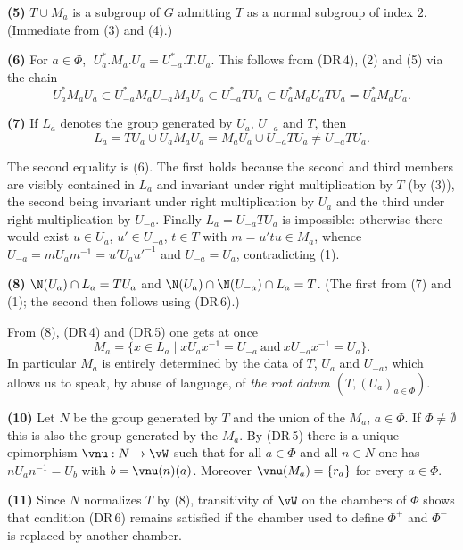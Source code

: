 \documentclass[12pt,a4paper,oneside,english]{smfart}
\theoremstyle{definition}
\theoremstyle{bt}
\begin{document}
\noindent\textbf{(5)} $T\cup M_a$ is a subgroup of $G$ admitting $T$ as a normal
subgroup of index $2$. (Immediate from (3) and (4).)

\medskip
\noindent\textbf{(6)} For $a\in\Phi$, $\;U_a^{*}.M_a.U_a=U_{-a}^{*}.T.U_a$.
This follows from (DR\,4), (2) and (5) via the chain
\[ U_a^{*}M_aU_a\subset U_{-a}^{*}M_aU_{-a}M_aU_a\subset U_{-a}^{*}TU_a
   \subset U_a^{*}M_aU_aTU_a=U_a^{*}M_aU_a. \]

\medskip
\noindent\textbf{(7)} If $L_a$ denotes the group generated by $U_a$, $U_{-a}$
and $T$, then
\[ L_a=TU_a\cup U_aM_aU_a=M_aU_a\cup U_{-a}TU_a\ne U_{-a}TU_a. \]

\begin{sketch}
The second equality is (6). The first holds because the second and third members
are visibly contained in $L_a$ and invariant under right multiplication by $T$
(by (3)), the second being invariant under right multiplication by $U_a$ and the
third under right multiplication by $U_{-a}$. Finally $L_a=U_{-a}TU_a$ is
impossible: otherwise there would exist $u\in U_a$, $u'\in U_{-a}$, $t\in T$ with
$m=u'tu\in M_a$, whence $U_{-a}=mU_am^{-1}=u'U_au'^{-1}$ and $U_{-a}=U_a$,
contradicting (1).
\end{sketch}

\noindent\textbf{(8)} $\N(U_a)\cap L_a=TU_a$ and
$\N(U_a)\cap\N(U_{-a})\cap L_a=T$. (The first from (7) and (1); the second then
follows using (DR\,6).)

\medskip
\noindent From (8), (DR\,4) and (DR\,5) one gets at once
\begin{equation}
M_a=\{x\in L_a\mid xU_ax^{-1}=U_{-a}\ \text{and}\ xU_{-a}x^{-1}=U_a\}.
\end{equation}
In particular $M_a$ is entirely determined by the data of $T$, $U_a$ and
$U_{-a}$, which allows us to speak, by abuse of language, of \emph{the root datum
$(T,(U_a)_{a\in\Phi})$}.

\medskip
\noindent\textbf{(10)} Let $N$ be the group generated by $T$ and the union of
the $M_a$, $a\in\Phi$. If $\Phi\ne\emptyset$ this is also the group generated by
the $M_a$. By (DR\,5) there is a unique epimorphism $\vnu:N\to\vW$ such that for
all $a\in\Phi$ and all $n\in N$ one has $nU_an^{-1}=U_b$ with $b=\vnu(n)(a)$.
Moreover $\vnu(M_a)=\{r_a\}$ for every $a\in\Phi$.

\medskip
\noindent\textbf{(11)} Since $N$ normalizes $T$ by (8), transitivity of $\vW$ on
the chambers of $\Phi$ shows that condition (DR\,6) remains satisfied if the
chamber used to define $\Phi^{+}$ and $\Phi^{-}$ is replaced by another chamber.
\end{document}
